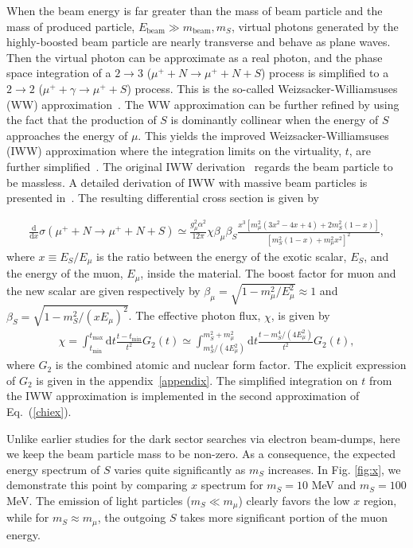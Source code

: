\documentclass[prd,onecolumn,notitlepage,
nofootinbib,aps,tightenlines,
preprintnumbers,amsmath,amssymb,amsfonts,showpacs,superscriptaddress]{revtex4-1}
\renewcommand{\eqref}[1]{Eq.~(\ref{#1})}
\renewcommand{\d}{\text{d}}
\newcommand{\f}{\frac}
\newcommand{\be}{\begin{eqnarray}}
\newcommand{\ee}{\end{eqnarray}}
\renewcommand{\d}{\text{d}}
\begin{document}
When  the beam energy is far greater than the mass of beam particle and the mass of produced particle, $E_\text{beam}\gg m_\text{beam}, m_S$, virtual photons generated by the highly-boosted beam particle are nearly transverse and behave as  plane waves. Then the virtual photon can be approximate as a real photon, and the phase space integration of a $2\to 3$ ($\mu^+ +  N \to \mu^+  + N + S$) process is simplified to a $2\to 2$ ($\mu^+  + \gamma \to \mu^+ + S$) process. This is the so-called Weizsacker-Williamsuses (WW) approximation~\cite{Kim:1973he}. The WW approximation can be further refined by using the fact that the production of $S$ is dominantly collinear when the energy of $S$ approaches the energy of $\mu$. This yields the improved  Weizsacker-Williamsuses (IWW) approximation where the integration limits on the virtuality, $t$, are further simplified~\cite{Kim:1973he, Bjorken:2009mm}. The original  IWW derivation~\cite{Kim:1973he, Bjorken:2009mm} regards the beam particle to be massless. A detailed derivation of IWW with massive beam particles is presented in~\cite{Liu:2016mqv}.  The resulting differential cross section is given by 

\be
\f{\d }{\d x} \sigma(\mu^+ + N \to \mu^+ + N + S) \simeq \f{g_\mu^2 \alpha^2}{12\pi} \chi \beta_\mu \beta_S \f{x^3\left[m_\mu^2 (3x^2-4 x+4)+2 m_S^2 (1-x)\right]}{\left[m_S^2(1-x)+m_\mu^2 x^2\right]^2},
\ee
where $x\equiv E_S/E_\mu$ is the ratio between the energy of the exotic scalar, $E_S$, and the energy of the muon, $E_\mu$, inside the material. The boost factor for muon and the new scalar are given respectively by $\beta_\mu = \sqrt{1-m_\mu^2/E_\mu^2}\approx 1$ and  $\beta_S = \sqrt{1-m_S^2/(x E_\mu)^2}$.  The effective photon flux, $\chi$, is given by
\be
\chi = \int_{t_{\min}}^{t_{\max}} \d t  \f{t-t_{\min}}{t^2} G_2(t)\simeq \int_{m_S^4/\left(4 E^2_\mu\right)}^{m_S^2+m_\mu^2} \d t  \f{t-m_S^4/\left(4 E^2_\mu\right)}{t^2} G_2(t),
\label{chiex}
\ee
where $G_2$ is the combined atomic and nuclear form factor. The explicit expression of $G_2$ is given in the appendix~\ref{appendix}.  The simplified integration on $t$ from the IWW approximation is implemented in the second approximation of \eqref{chiex}. 


Unlike earlier studies for the dark sector searches via electron beam-dumps, here we keep the beam particle mass to be non-zero.  As a consequence, 
the expected energy spectrum of $S$ varies quite significantly as $m_S$ increases. In 
Fig. \ref{fig:x}, we demonstrate this point by comparing $x$ spectrum for $m_S=10$ MeV and $m_S= 100$ MeV. 
The emission of light particles ($m_S \ll m_\mu$) clearly favors the low $x$ region, while for 
$m_S \approx m_\mu$, the outgoing $S$ takes more significant portion of the muon energy. 
\end{document}
